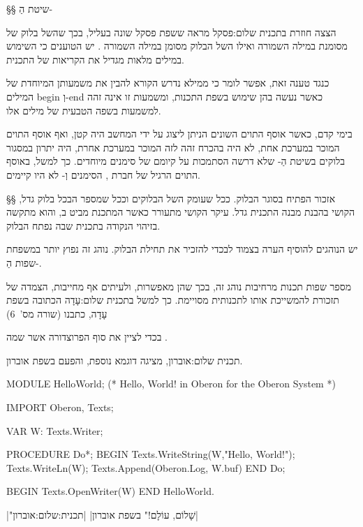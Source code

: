     §§ שיטת הַ-

    הצצה חוזרת ב תכנית שלום:פסקל מראה ששפת פסקל שונה בעליל, בכך שה של בלוק
    של  מסומנת במילה השמורה  ואילו ה של הבלוק מסומן במילה
    השמורה .
    יש הטוענים כי השימוש במילים מלאות מגדיל את הקריאות של התכנית.

    כנגד טענה זאת, אפשר לומר כי ממילא נדרש הקורא להבין את משמעותן המיוחדת של
    המילים begin וְ-end כאשר נעשה בהן שימוש בשפת התכנות, ומשמעות זו אינה זהה
    למשמעות בשפה הטבעית של מילים אלו.

    בימי קדם, כאשר אוסף התוים השונים הניתן ליצוג על ידי המחשב היה קטן, ואף אוסף
    התוים המוכר במערכת אחת, לא היה בהכרח זהה לזה המוכר במערכת אחרת, היה יתרון
    במסגור בלוקים בשיטת הַ- שלא דרשה הסתמכות על
    קיומם של סימנים מיוחדים. כך למשל, באוסף התוים הרגיל של חברת ,
    הסימנים  וְ- לא היו קיימים.

    §§ אזכור הפתיח בסוגר הבלוק.
    ככל שעומק ה של הבלוקים וככל שמספר ה בכל בלוק גדל, הקושי בהבנת מבנה
    התכנית גדל. עיקר הקושי מתעורר כאשר המתכנת מביט ב, והוא מתקשה בזיהוי
    הנקודה בתכנית שבה נפתח הבלוק.

    יש הנוהגים להוסיף הערה בצמוד ל בכדי להזכיר את תחילת הבלוק. נוהג
    זה נפוץ יותר במשפחת שפות הַ-.

    מספר שפות תכנות מרחיבות נוהג זה, בכך שהן מאפשרות, ולעיתים אף מחייבות, הצמדה
    של תזכורת ל המשייכת אותו ל תכנותית מסויימת.
    כך למשל ב תכנית שלום:עָדָה הכתובה בשפת עָדָה, כתבנו
    (שורה מס'~6)
    \begin{קוד}
    \end{קוד}
    בכדי לציין את סוף הפרוצדורה אשר שמה .

     תכנית שלום:אוברון, מציגה דוגמא נוספת, והפעם בשפת אוברון.

    \begin{תכנית}
    \begin{OBERONn}
      MODULE HelloWorld;
      (* Hello, World! in Oberon for the Oberon System *)

      IMPORT Oberon, Texts;

      VAR
      W: Texts.Writer;

      PROCEDURE Do*;
      BEGIN
      Texts.WriteString(W,"Hello, World!");
      Texts.WriteLn(W);
      Texts.Append(Oberon.Log, W.buf)
      END Do;

      BEGIN
      Texts.OpenWriter(W)
      END HelloWorld.
    \end{OBERONn}
    \setRTL
    |"שָׁלוֹם, עוֹלָם!" בשפת אוברון|
    |תכנית:שלום:אוברון|
    \end{תכנית}

